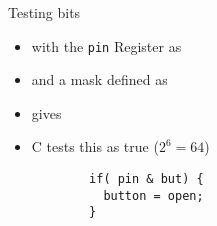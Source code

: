 \documentclass[svgnames,x11names]{beamer}
\begin{document}
\begin{frame}[fragile]{Testing bits}
\begin{example}
    \begin{itemize}
    \item with the \texttt{pin}  
    Register as
    \item and a mask defined as
      \begin{minipage}{0.8\linewidth}
        \begin{block}{}
        \end{block}
      \end{minipage}

      \begin{minipage}{0.8\linewidth}
        \begin{block}{}
        \end{block}
      \end{minipage}
\item
      gives 
    \item C tests this as true ($2^6=64$)
      \begin{minipage}{0.8\linewidth}
        \begin{block}{}
\begin{verbatim}
        if( pin & but) {
          button = open;
        }
\end{verbatim}
        \end{block}
      \end{minipage}
    \end{itemize}
  \end{example}
\end{frame}



\end{document}
